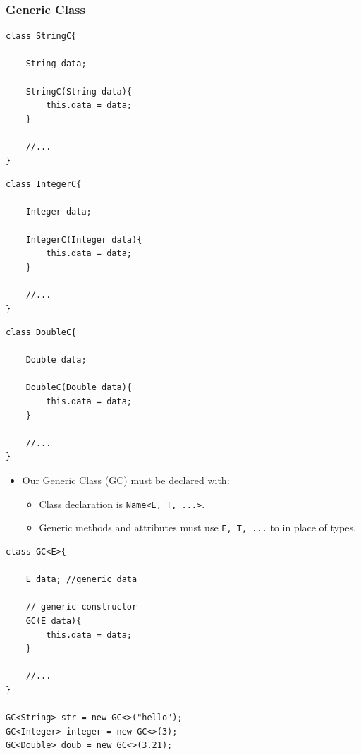 \documentclass{beamer}
\begin{document}
\begin{frame}[fragile]
    \frametitle{Generic Class}
    \begin{minipage}{0.32\textwidth}
        \begin{lstlisting}[basicstyle=\tiny]
class StringC{

    String data; 
    
    StringC(String data){
        this.data = data;
    }

    //...
}
        \end{lstlisting}
    \end{minipage}
    \begin{minipage}{0.32\textwidth}
        \begin{lstlisting}[basicstyle=\tiny]
class IntegerC{

    Integer data; 
    
    IntegerC(Integer data){
        this.data = data;
    }

    //...
}
        \end{lstlisting}
    \end{minipage}
    \hfill
    \begin{minipage}{0.32\textwidth}
        \begin{lstlisting}[basicstyle=\tiny]
class DoubleC{

    Double data; 
    
    DoubleC(Double data){
        this.data = data;
    }

    //...
}
        \end{lstlisting}
    \end{minipage}
    \hline
    \begin{minipage}{0.4\textwidth}
        \begin{itemize}
            \item Our Generic Class (GC) must be declared with:
            \begin{itemize}
                \item Class declaration is \lstinline|Name<E, T, ...>|.
                \item Generic methods and attributes must use \lstinline|E, T, ...| to in place of types.
            \end{itemize}
        \end{itemize}
    \end{minipage}
    \hfill
    \begin{minipage}{0.49\textwidth}
        \begin{lstlisting}[basicstyle=\tiny]
class GC<E>{

    E data; //generic data
    
    // generic constructor
    GC(E data){
        this.data = data;
    }

    //...
}

GC<String> str = new GC<>("hello");
GC<Integer> integer = new GC<>(3);
GC<Double> doub = new GC<>(3.21);
        \end{lstlisting}
    \end{minipage}
\end{frame}
\end{document}
